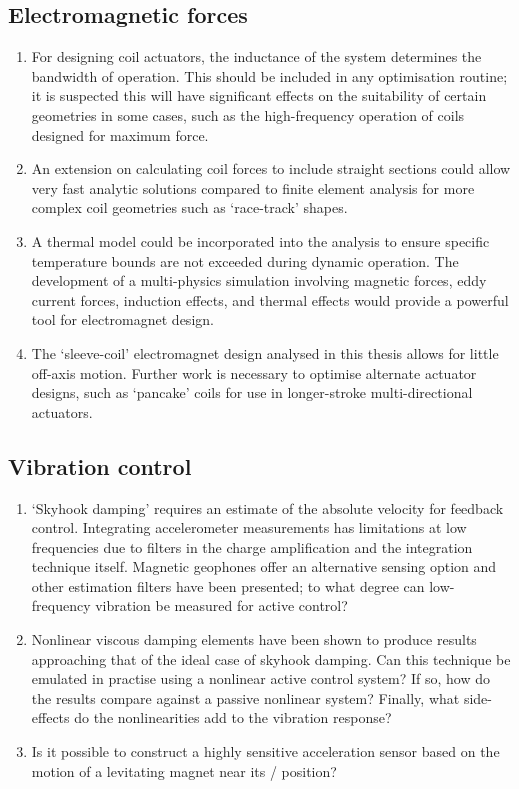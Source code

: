 \documentclass[11pt,a4paper]{memoir}
\begin{document}
\subsection{Electromagnetic forces}

\begin{enumerate}
\item For designing coil actuators, the inductance of the system determines the bandwidth of operation.
This should be included in any optimisation routine; it is suspected this will have significant effects on the suitability of certain geometries in some cases, such as the high-frequency operation of coils designed for maximum force.

\item An extension on calculating coil forces to include straight sections could allow very fast analytic solutions compared to finite element analysis for more complex coil geometries such as `race-track' shapes.

\item A thermal model could be incorporated into the analysis to ensure specific temperature bounds are not exceeded during dynamic operation.
The development of a multi-physics simulation involving magnetic forces, eddy current forces, induction effects, and thermal effects would provide a powerful tool for electromagnet design.

\item The `sleeve-coil' electromagnet design analysed in this thesis allows for little off-axis motion.
Further work is necessary to optimise alternate actuator designs, such as `pancake' coils for use in longer-stroke multi-directional actuators.
\end{enumerate}

\subsection{Vibration control}

\begin{enumerate}
\item
`Skyhook damping' requires an estimate of the absolute velocity for feedback control.
Integrating accelerometer measurements has limitations at low frequencies due to filters in the charge amplification and the integration technique itself.
Magnetic geophones offer an alternative sensing option and other estimation filters have been presented; to what degree can low-frequency vibration be measured for active control?

\item
Nonlinear viscous damping elements have been shown to produce results approaching that of the ideal case of skyhook damping.
Can this technique be emulated in practise using a nonlinear active control system?
If so, how do the results compare against a passive nonlinear system?
Finally, what side-effects do the nonlinearities add to the vibration response?

\item
Is it possible to construct a highly sensitive acceleration sensor based on the motion of a levitating magnet near its \qzs/ position?
\end{enumerate}
\end{document}
